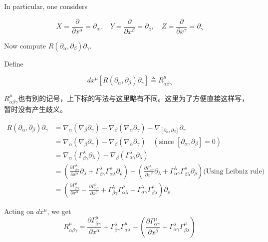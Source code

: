 In particular, one considers

\[
X = \frac{\partial}{\partial x^\alpha} = \partial_\alpha, \quad 
Y = \frac{\partial}{\partial x^\beta} = \partial_\beta, \quad 
Z = \frac{\partial}{\partial x^\gamma} = \partial_\gamma
\]

Now compute \( R(\partial_\alpha, \partial_\beta) \partial_\gamma \).

Define 

\[
 dx^\mu [R(\partial_\alpha, \partial_\beta) \partial_\gamma]\triangleq R_{\alpha\beta\gamma}^\mu
\]
\begin{remark}
  $ R_{\alpha\beta\gamma}^\mu $也有别的记号，上下标的写法与这里略有不同。这里为了方便直接这样写，暂时没有产生歧义。
\end{remark}
\begin{equation*}
\begin{aligned}
R(\partial_\alpha, \partial_\beta) \partial_\gamma 
&= \nabla_\alpha (\nabla_\beta \partial_\gamma) - \nabla_\beta (\nabla_\alpha \partial_\gamma) - \nabla_{[\partial_\alpha, \partial_\beta]} \partial_\gamma \\
&= \nabla_\alpha (\nabla_\beta \partial_\gamma) - \nabla_\beta (\nabla_\alpha \partial_\gamma) \quad (\text{since } [\partial_\alpha, \partial_\beta] = 0) \\
&= \nabla_\alpha (\Gamma_{\beta\gamma}^\lambda \partial_\lambda) - \nabla_\beta (\Gamma_{\alpha\gamma}^\lambda \partial_\lambda) \\
&= \left( \frac{\partial \Gamma_{\beta\gamma}^\lambda}{\partial x^\alpha} \partial_\lambda + \Gamma_{\beta\gamma}^\lambda \Gamma_{\alpha\lambda}^\rho \partial_\rho \right) 
- \left( \frac{\partial \Gamma_{\alpha\gamma}^\lambda}{\partial x^\beta} \partial_\lambda + \Gamma_{\alpha\gamma}^\lambda \Gamma_{\beta\lambda}^\rho \partial_\rho \right) \text{(Using Leibniz rule)}\\
&= \left( \frac{\partial \Gamma_{\beta\gamma}^\rho}{\partial x^\alpha} - \frac{\partial \Gamma_{\alpha\gamma}^\rho}{\partial x^\beta} 
+ \Gamma_{\beta\gamma}^\lambda \Gamma_{\alpha\lambda}^\rho - \Gamma_{\alpha\gamma}^\lambda \Gamma_{\beta\lambda}^\rho \right) \partial_\rho
\end{aligned}
\end{equation*}

Acting on $dx^\mu$, we get
\[
R_{\alpha\beta\gamma}^\mu = \frac{\partial \Gamma_{\beta\gamma}^\mu}{\partial x^\alpha} + \Gamma_{\beta\gamma}^\lambda \Gamma_{\alpha\lambda}^\mu - \left( \frac{\partial \Gamma_{\alpha\gamma}^\mu}{\partial x^\beta} + \Gamma_{\alpha\gamma}^\lambda \Gamma_{\beta\lambda}^\mu \right)
\]

